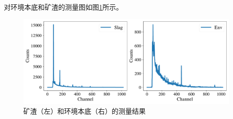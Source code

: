 \documentclass{article}
\begin{document}
    对环境本底和矿渣的测量图如图\ref{fig:slag_vs_env}所示。
    \begin{figure}
        \centering
        \includegraphics[width=\textwidth]{../plots/slag_vs_env.pdf}
        \caption{矿渣（左）和环境本底（右）的测量结果\label{fig:slag_vs_env}}
    \end{figure}
\end{document}
